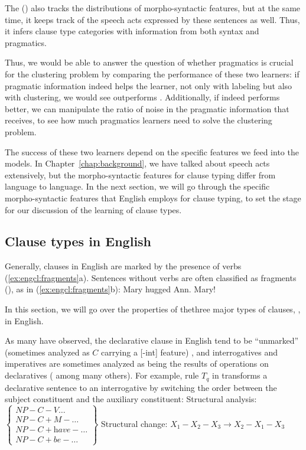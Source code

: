 The \tbf{\praglearner{}} (\plearnerabbr{}) also tracks the distributions of morpho-syntactic features, but at the same time, it  keeps track of the speech acts expressed by these sentences as well. Thus, it infers clause type categories with information from both syntax and pragmatics. 

Thus, we would be able to answer the question of whether pragmatics is crucial for the clustering problem by comparing the performance of these two learners: if pragmatic information indeed helps the learner, not only with labeling but also with clustering, we would see \plearnerabbr{} outperforms \dlearnerabbr. Additionally, if \plearnerabbr{} indeed performs better, we can manipulate the ratio of noise in the pragmatic information that \plearnerabbr{} receives, to see how much pragmatics learners need to solve the clustering problem. 


The success of these two learners depend on the specific features we feed into the models. In Chapter~\ref{chap:background}, we have talked about speech acts extensively, but the morpho-syntactic features for clause typing differ from language to language. In the next section, we will go through the specific morpho-syntactic features that English employs for clause typing, to set the stage for our discussion of the learning of clause types. 


\subsection{Clause types in English} \label{sec:engcl:bg:grammar}

Generally, clauses in English are marked by the presence of verbs (\ref{ex:engcl:fragments}a). Sentences without verbs are often classified as fragments (\cite{sz1985speechact}), as in (\ref{ex:engcl:fragments}b):
\bxl{}
Mary hugged Ann.
\ex
Mary!
\exl
\eex

In this section, we will go over the properties of thethree major types of clauses, \diis{}, in English. 

As many have observed, the declarative clause in English tend to be ``unmarked'' (sometimes analyzed as $C$ carrying a [-int] feature) , and interrogatives and imperatives are sometimes analyzed as being the results of operations on declaratives (\cite{sz1985speechact, chomsky1957,chomsky1995minimalist, akmajian1984clausetype, platzack1997imp,rizzi1997} among many others). For example, rule $T_{q}$ in \textcite{chomsky1957} transforms a declarative sentence to an interrogative by switching the order between the subject constituent and the auxiliary constituent:
\bxl
Structural analysis: $ \left\{\begin{array}{l}
NP-C-V \ldots\\
NP-C+M-\ldots\\ 
NP-C+\textit{have}-\ldots\\ 
NP-C+\textit{be}-\ldots 
\end{array} \right \}
$
\ex Structural change: $X_{1} - X_{2} - X_{3} \rightarrow X_{2} - X_{1} - X_{3} $
\hfill \textcite[p.112]{chomsky1957}
\exl
\eex

